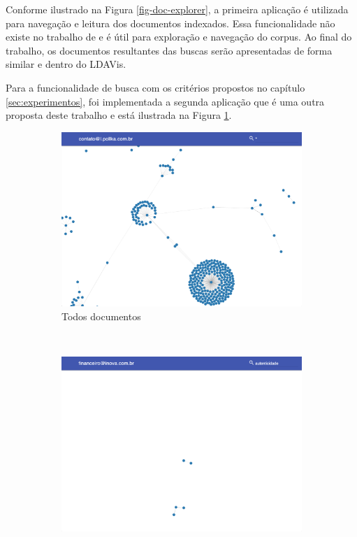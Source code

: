 \documentclass[12pt,a4paper]{article}
\begin{document}
Conforme ilustrado na Figura \ref{fig-doc-explorer}, a primeira aplicação é utilizada para navegação e leitura dos documentos
 indexados. Essa funcionalidade não existe no trabalho de  e é útil para exploração e navegação do corpus.
 Ao final do trabalho, os documentos resultantes das buscas serão apresentadas de forma similar e dentro do LDAVis. 

Para a funcionalidade de busca com os critérios propostos no capítulo \ref{sec:experimentos}, foi implementada a segunda aplicação que é uma outra proposta deste trabalho e está ilustrada na Figura \ref{fig-search-all}.

\begin{figure}[H]
  \centering
  \begin{subfigure}[b]{0.48\textwidth}
      \includegraphics[width=\textwidth]{images/figure_9.png}
      \caption{Todos documentos}
      \label{fig-search-all}
  \end{subfigure}
  ~ %
  \begin{subfigure}[b]{0.48\textwidth}
      \includegraphics[width=\textwidth]{images/figure_10.png}

\end{subfigure}
\end{figure}
\end{document}
